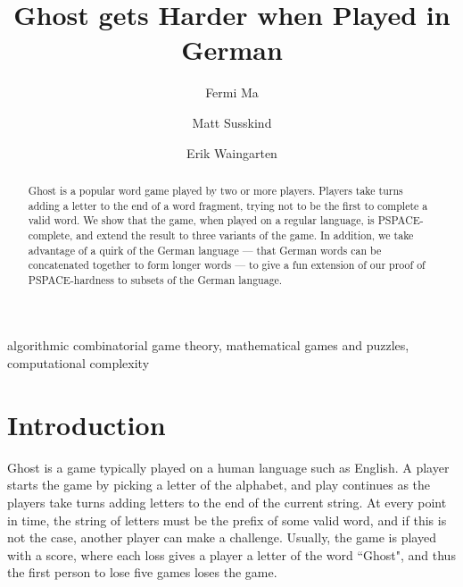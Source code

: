 \documentclass[runningheads,a4paper]{llncs}
\newcommand{\keywords}[1]{\par\addvspace\baselineskip
\noindent\keywordname\enspace\ignorespaces#1}
\begin{document}
\mainmatter  

\title{Ghost gets Harder when Played in German}

\author{Fermi Ma
\and Matt Susskind \and Erik Waingarten}
%


%
%

\maketitle


\begin{abstract}

Ghost is a popular word game played by two or more players. Players take turns adding a letter to the end of a word fragment, trying not to be the first to complete a valid word. We show that the game, when played on a regular language, is PSPACE-complete, and extend the result to three variants of the game. In addition, we take advantage of a quirk of the German language --- that German words can be concatenated together to form longer words --- to give a fun extension of our proof of PSPACE-hardness to subsets of the German language. 
\end{abstract}

\keywords{algorithmic combinatorial game theory, mathematical games and puzzles, computational complexity}

\section{Introduction}

	Ghost is a game typically played on a human language such as English. A player starts the game by picking a letter of the alphabet, and play continues as the players take turns adding letters to the end of the current string. At every point in time, the string of letters must be the prefix of some valid word, and if this is not the case, another player can make a challenge. Usually, the game is played with a score, where each loss gives a player a letter of the word ``Ghost", and thus the first person to lose five games loses the game.
\end{document}
